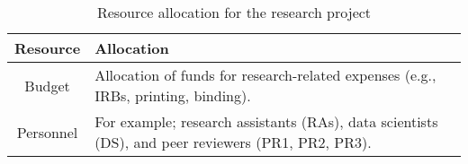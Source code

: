 \begin{table}[h!]
    \centering
    \begin{tabularx}{\textwidth}{|c|X|}
        \hline
        \textbf{Resource} & \textbf{Allocation} \\
        \hline
        Budget & Allocation of funds for research-related expenses (e.g., IRBs, printing, binding). \\
        Personnel & For example; research assistants (RAs), data scientists (DS), and peer reviewers (PR1, PR2, PR3). \\
        \hline
    \end{tabularx}
    \caption{Resource allocation for the research project}
    \label{tab:resource_allocation}
\end{table}